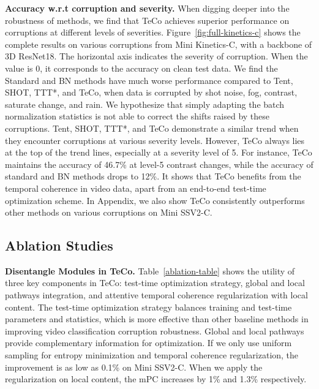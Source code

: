 \documentclass{article} %
\begin{document}
\textbf{Accuracy w.r.t corruption and severity.}
When digging deeper into the robustness of methods, we find that TeCo achieves superior performance on corruptions at different levels of severities. Figure~\ref{fig:full-kinetics-c} shows the complete results on various corruptions from Mini Kinetics-C, with a backbone of 3D ResNet18. 
The horizontal axis indicates the severity of corruption. 
When the value is 0, it corresponds to the accuracy on clean test data. 
We find the Standard and BN methods have much worse performance compared to Tent, SHOT, TTT*, and TeCo, when data is corrupted by shot noise, fog, contrast, saturate change, and rain.
We hypothesize that simply adapting the batch normalization statistics is not able to correct the shifts raised by these corruptions. Tent, SHOT, TTT*, and TeCo demonstrate a similar trend when they encounter corruptions at various severity levels.
However, TeCo always lies at the top of the trend lines, especially at a severity level of 5. 
For instance, TeCo maintains the accuracy of 46.7\% at level-5 contrast changes, while the accuracy of standard and BN methods drops to 12\%. 
It shows that TeCo benefits from the temporal coherence in video data, apart from an end-to-end test-time optimization scheme. In Appendix, we also show TeCo consistently outperforms other methods on various corruptions on Mini SSV2-C.



\subsection{Ablation Studies}
\textbf{Disentangle Modules in TeCo.}
Table~\ref{ablation-table} shows the utility of three key components in TeCo: test-time optimization strategy, global and local pathways integration, and attentive temporal coherence regularization with local content. 
The test-time optimization strategy balances training and test-time parameters and statistics, which is more effective than other baseline methods in improving video classification corruption robustness. 
Global and local pathways provide complementary information for optimization. If we only use uniform sampling for entropy minimization and temporal coherence regularization, the improvement is as low as 0.1\% on Mini SSV2-C. 
When we apply the regularization on local content, the mPC increases by 1\% and 1.3\% respectively.  
\end{document}
